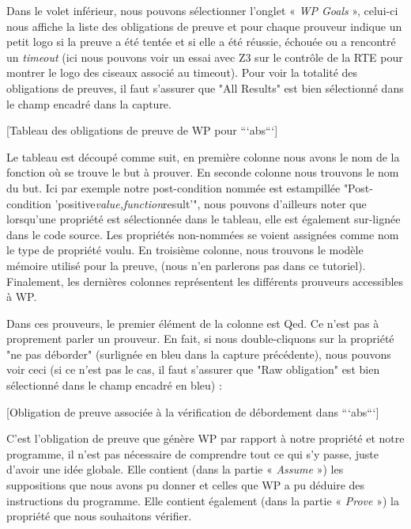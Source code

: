 Dans le volet inférieur, nous pouvons sélectionner l'onglet « \textit{WP Goals} », 
celui-ci nous affiche la liste des obligations de preuve et pour chaque 
prouveur indique un petit logo si la preuve a été tentée et si elle a été 
réussie, échouée ou a rencontré un \textit{timeout} (ici nous pouvons voir un essai 
avec Z3 sur le contrôle de la RTE pour montrer le logo des ciseaux 
associé au timeout). Pour voir la totalité des obligations de preuves, il
faut s'assurer que "All Results" est bien sélectionné dans le champ encadré
dans la capture.



[Tableau des obligations de preuve de WP pour ```abs```]


Le tableau est découpé comme suit, en première colonne nous avons le nom de la
fonction où se trouve le but à prouver. En seconde colonne nous trouvons le nom
du but. Ici par exemple notre post-condition nommée est estampillée 
"Post-condition 'positive\textit{value,function}result'", nous pouvons d'ailleurs noter
que lorsqu'une propriété est sélectionnée dans le tableau, elle est également 
sur-lignée dans le code source. Les propriétés non-nommées se voient assignées
comme nom le type de propriété voulu. En troisième colonne, nous trouvons le 
modèle mémoire utilisé pour la preuve, (nous n'en parlerons pas dans ce 
tutoriel). Finalement, les dernières colonnes représentent les différents 
prouveurs accessibles à WP.



Dans ces prouveurs, le premier élément de la colonne est Qed. Ce n'est pas
à proprement parler un prouveur. En fait, si nous double-cliquons sur la 
propriété "ne pas déborder" (surlignée en bleu dans la capture précédente), 
nous pouvons voir ceci (si ce n'est pas le cas, il faut s'assurer que
"Raw obligation" est bien sélectionné dans le champ encadré en bleu) :



[Obligation de preuve associée à la vérification de débordement dans ```abs```]


C'est l'obligation de preuve que génère WP par rapport à notre propriété et 
notre programme, il n'est pas nécessaire de comprendre tout ce qui s'y passe, 
juste d'avoir une idée globale. Elle contient (dans la partie « \textit{Assume} ») les 
suppositions que nous avons pu donner et celles que WP a pu déduire des 
instructions du programme. Elle contient également (dans la partie « \textit{Prove} ») 
la propriété que nous souhaitons vérifier.



